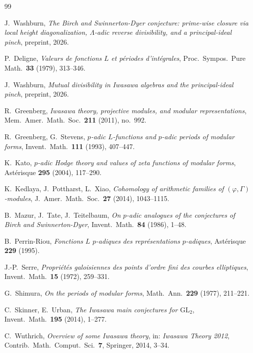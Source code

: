 \documentclass[11pt]{amsart}
\theoremstyle{definition}
\theoremstyle{remark}
\newcommand{\Lam}{\Lambda}
\begin{document}
\begin{thebibliography}{99}

J.~Washburn,
\emph{The Birch and Swinnerton-Dyer conjecture: prime-wise closure
via local height diagonalization, $\Lam$-adic reverse divisibility,
and a principal-ideal pinch},
preprint, 2026.

P.~Deligne,
\emph{Valeurs de fonctions $L$ et p\'eriodes d'int\'egrales},
Proc.\ Sympos.\ Pure Math.\ \textbf{33} (1979), 313--346.

J.~Washburn,
\emph{Mutual divisibility in Iwasawa algebras and the principal-ideal
pinch},
preprint, 2026.

R.~Greenberg,
\emph{Iwasawa theory, projective modules, and modular representations},
Mem.\ Amer.\ Math.\ Soc.\ \textbf{211} (2011), no.~992.

R.~Greenberg, G.~Stevens,
\emph{$p$-adic $L$-functions and $p$-adic periods of modular forms},
Invent.\ Math.\ \textbf{111} (1993), 407--447.

K.~Kato,
\emph{$p$-adic Hodge theory and values of zeta functions of modular
forms},
Ast\'erisque \textbf{295} (2004), 117--290.

K.~Kedlaya, J.~Pottharst, L.~Xiao,
\emph{Cohomology of arithmetic families of $(\varphi,\Gamma)$-modules},
J.\ Amer.\ Math.\ Soc.\ \textbf{27} (2014), 1043--1115.

B.~Mazur, J.~Tate, J.~Teitelbaum,
\emph{On $p$-adic analogues of the conjectures of Birch and
Swinnerton-Dyer},
Invent.\ Math.\ \textbf{84} (1986), 1--48.

B.~Perrin-Riou,
\emph{Fonctions $L$ $p$-adiques des repr\'esentations $p$-adiques},
Ast\'erisque \textbf{229} (1995).

J.-P.~Serre,
\emph{Propri\'et\'es galoisiennes des points d'ordre fini des courbes
elliptiques},
Invent.\ Math.\ \textbf{15} (1972), 259--331.

G.~Shimura,
\emph{On the periods of modular forms},
Math.\ Ann.\ \textbf{229} (1977), 211--221.

C.~Skinner, E.~Urban,
\emph{The Iwasawa main conjectures for $\mathrm{GL}_2$},
Invent.\ Math.\ \textbf{195} (2014), 1--277.

C.~Wuthrich,
\emph{Overview of some Iwasawa theory},
in: \emph{Iwasawa Theory 2012}, Contrib.\ Math.\ Comput.\ Sci.\
\textbf{7}, Springer, 2014, 3--34.

\end{thebibliography}
\end{document}

